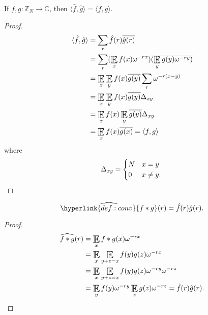 \documentclass{article}
\DeclareMathOperator*{\E}{\scalerel*{\mathbb{E}}{\textstyle\sum}}
\newcommand{\1}[1]{\mathbbm{1}_{#1}}
\begin{document}
\begin{nlemma}
  If $f,g: \mathbb{Z}_N \to \mathbb{C}$, then $\langle \hat{f}, \hat{g} \rangle = \langle f, g \rangle$.
\end{nlemma}
\begin{proof}
  \begin{align*}
    \langle \hat{f}, \hat{g} \rangle &= \sum_r \hat{f}(r) \overline{\hat{g}(r)} \\
                                     &= \sum_r (\E_x f(x) \omega^{-r x}) \overline{(\E_y g(y) \omega^{-r y})} \\
                                     &= \E_x \E_y f(x) \overline{g(y)} \sum_r \omega^{-r(x-y)} \\
                                     &= \E_x \E_y f(x) \overline{g(y)} \Delta_{xy} \\
                                     &= \E_x f(x) \E_y \overline{g(y)} \Delta_{xy} \\
                                     &= \E_x f(x) \overline{g(x)} = \langle f, g \rangle
  \end{align*}
  where
  \begin{equation*}
    \Delta_{xy} =
    \begin{cases}
      N & x = y \\
      0 & x \neq y.
    \end{cases} \qedhere
  \end{equation*}
\end{proof}


\begin{nlemma}
  \begin{equation*}
    \widehat{\hyperlink{def:conv}{f * g}}(r) = \hat{f}(r) \hat{g}(r).
  \end{equation*}
\end{nlemma}
\begin{proof}
  \begin{align*}
    \widehat{f * g}(r) &= \E_x f * g(x) \omega^{-r x} \\
                       &= \E_x \E_{y + z = x} f(y) g(z) \omega^{- r x} \\
                       &= \E_x \E_{y + z = x} f(y) g(z) \omega^{- r y} \omega^{- r z} \\
                       &= \E_y f(y) \omega^{-r y} \E_z g(z) \omega^{-r z} = \hat{f}(r) \hat{g}(r). \qedhere
  \end{align*}
\end{proof}
\end{document}
